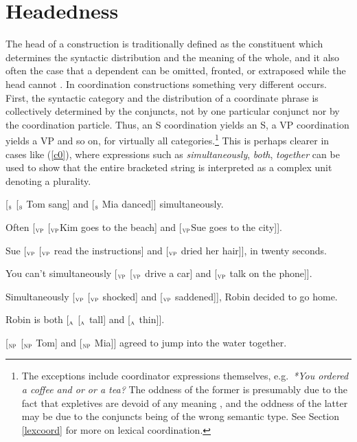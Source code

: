 \documentclass[output=paper]{langsci/langscibook}
\newcommand{\subl}[1]{$_{\small \textsc{#1}}$}
\begin{document}
\section{Headedness}

The head of a construction is traditionally defined as the constituent which determines the syntactic distribution and the meaning of the whole, and it also often the case that a dependent can be omitted, fronted, or extraposed while the head cannot \citep{zwicky85}. In coordination constructions something very different occurs. First, the syntactic category and the distribution of a coordinate phrase is collectively determined by the conjuncts, not by one particular conjunct nor by the coordination particle. Thus, an S coordination yields an S, a VP coordination yields a VP and so on, for virtually all categories.\footnote{The exceptions include coordinator expressions themselves, e.g.\ \emph{*You ordered a coffee and or or a tea?} The oddness of the former is presumably due to the fact that expletives are devoid of any meaning
\citep{MuellerGT-Eng0}, and the oddness of the latter may be due to the conjuncts being of the wrong semantic type. See Section \ref{lexcoord} for more on lexical coordination.}
This is perhaps clearer in cases like (\ref{c0}), where
expressions such as \emph{simultaneously}, \emph{both}, 
\emph{together} can be used to show that the entire bracketed string
is interpreted as a complex unit denoting a plurality.


\begin{exe}
\ex
\begin{xlista}
\ex{} [\subl{s} [\subl{s} Tom sang] and [\subl{s} Mia danced]] simultaneously.

\ex{} Often [\subl{vp} [\subl{vp}Kim goes to the beach] and [\subl{vp}Sue goes to the city]].

\ex{} Sue [\subl{vp} [\subl{vp} read the instructions] and [\subl{vp} dried her hair]], in twenty seconds.

\ex{} You can't simultaneously [\subl{vp} [\subl{vp} drive a car] and [\subl{vp} talk on the phone]].

\ex{} Simultaneously [\subl{vp} [\subl{vp} shocked] and [\subl{vp} saddened]], Robin decided to go home.

\ex Robin is both [\subl{a} [\subl{a} tall] and [\subl{a} thin]].

\ex{} [\subl{np} [\subl{np} Tom] and [\subl{np} Mia]] agreed to jump into the water together.

\end{xlista}\label{c0}
\end{exe}
\end{document}
